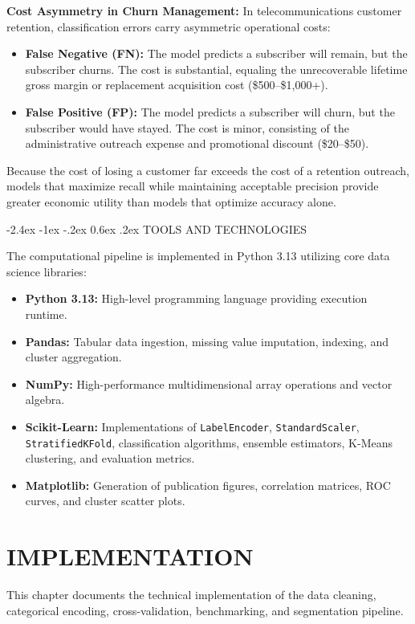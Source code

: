 \documentclass[12pt,oneside]{report}
\makeatletter
\renewcommand{\section}{\@startsection{section}{1}{\z@}%
  {-2.4ex \@plus -1ex \@minus -.2ex}%
  {0.6ex \@plus .2ex}%
  {\normalfont\large\bfseries}}
\newcommand{\chapterpage}[1]{\chapter{#1}}
\makeatother
\begin{document}
\textbf{Cost Asymmetry in Churn Management:} In telecommunications customer retention, classification errors carry asymmetric operational costs:
\begin{itemize}
    \item \textbf{False Negative (FN):} The model predicts a subscriber will remain, but the subscriber churns. The cost is substantial, equaling the unrecoverable lifetime gross margin or replacement acquisition cost (\$500--\$1,000+).
    \item \textbf{False Positive (FP):} The model predicts a subscriber will churn, but the subscriber would have stayed. The cost is minor, consisting of the administrative outreach expense and promotional discount (\$20--\$50).
\end{itemize}
Because the cost of losing a customer far exceeds the cost of a retention outreach, models that maximize recall while maintaining acceptable precision provide greater economic utility than models that optimize accuracy alone.

\section{TOOLS AND TECHNOLOGIES}

The computational pipeline is implemented in Python 3.13 utilizing core data science libraries:
\begin{itemize}
    \item \textbf{Python 3.13:} High-level programming language providing execution runtime.
    \item \textbf{Pandas:} Tabular data ingestion, missing value imputation, indexing, and cluster aggregation.
    \item \textbf{NumPy:} High-performance multidimensional array operations and vector algebra.
    \item \textbf{Scikit-Learn:} Implementations of \texttt{LabelEncoder}, \texttt{StandardScaler}, \texttt{StratifiedKFold}, classification algorithms, ensemble estimators, K-Means clustering, and evaluation metrics.
    \item \textbf{Matplotlib:} Generation of publication figures, correlation matrices, ROC curves, and cluster scatter plots.
\end{itemize}

\clearpage

\chapterpage{IMPLEMENTATION}

This chapter documents the technical implementation of the data cleaning, categorical encoding, cross-validation, benchmarking, and segmentation pipeline.
\end{document}
